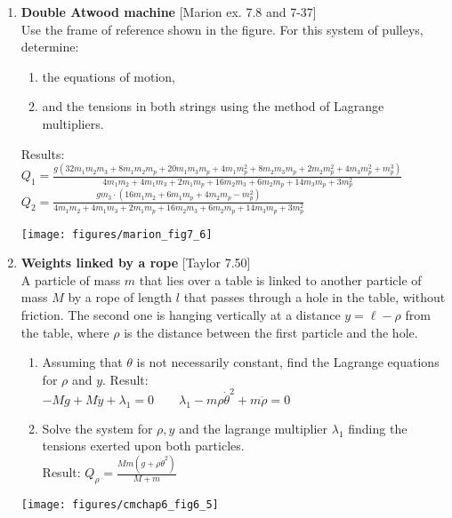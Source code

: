 \documentclass[11pt, a4paper, twoside]{article}
\begin{document}
\begin{enumerate}
	
	\item
	\begin{minipage}[t][6.5cm]{0.65\textwidth}
	\textbf{Double Atwood machine} [Marion ex. 7.8 and 7-37]\\
	Use the frame of reference shown in the figure.
	For this system of pulleys, determine: 
	\begin{enumerate}
		\item the equations of motion,
		\item and the tensions in both strings using the method of Lagrange multipliers.
	\end{enumerate}
	Results:\\
	\(
		Q_{1} = \frac{g \left(32 m_{1} m_{2} m_{3} + 8 m_{1} m_{2} m_{p} + 20 m_{1} m_{3} m_{p} + 4 m_{1} m_{p}^{2} + 8 m_{2} m_{3} m_{p} + 2 m_{2} m_{p}^{2} + 4 m_{3} m_{p}^{2} + m_{p}^{3}\right)}{4 m_{1} m_{2} + 4 m_{1} m_{3} + 2 m_{1} m_{p} + 16 m_{2} m_{3} + 6 m_{2} m_{p} + 14 m_{3} m_{p} + 3 m_{p}^{2}}
	\)\\
	\(
		Q_{2} = \frac{g m_{3} \cdot \left(16 m_{1} m_{2} + 6 m_{1} m_{p} + 4 m_{2} m_{p} - m_{p}^{2}\right)}{4 m_{1} m_{2} + 4 m_{1} m_{3} + 2 m_{1} m_{p} + 16 m_{2} m_{3} + 6 m_{2} m_{p} + 14 m_{3} m_{p} + 3 m_{p}^{2}}
	\)
	\end{minipage}
	\begin{minipage}[c][0.5cm][t]{0.3\textwidth}
		\texttt{[image: figures/marion\_fig7\_6]}
	\end{minipage}


	\item
	\begin{minipage}[t][6cm]{0.65\textwidth}
		\textbf{Weights linked by a rope} [Taylor 7.50]\\
		A particle of mass \(m\) that lies over a table is linked to another particle of mass \(M\) by a rope of length \(l\) that passes through a hole in the table, without friction.
		The second one is hanging vertically at a distance \(y = \ell - \rho\) from the table, where \(\rho\) is the distance between the first particle and the hole.
		\begin{enumerate}
			\item Assuming that \(\theta\) is not necessarily constant, find the Lagrange equations for \(\rho\) and \(y\). Result:\\ \(- M g + M \ddot{y} + \lambda_{1} = 0 \qquad \lambda_{1} - m \rho \dot{\theta}^{2} + m \ddot{\rho} = 0\)
			\item Solve the system for \(\rho, y\) and the lagrange multiplier \(\lambda_1\) finding the tensions exerted upon both particles.\\
			Result: \(Q_{\rho} = \frac{M m \left(g + \rho \dot{\theta}^{2}\right)}{M + m}\)
		\end{enumerate}
	\end{minipage}
	\begin{minipage}[c][0cm][t]{0.3\textwidth}
		\texttt{[image: figures/cmchap6\_fig6\_5]}
	\end{minipage}



\end{enumerate}
\end{document}
